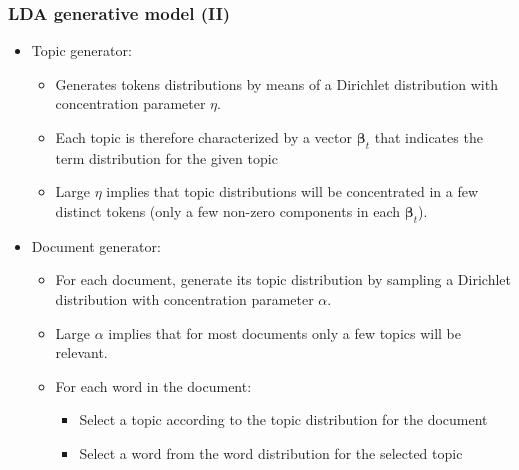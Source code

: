 \documentclass{beamer}
\begin{document}
\begin{frame}

    \frametitle{LDA generative model (II)}

	\begin{itemize}
	\item Topic generator:
	\begin{itemize}
	\item Generates tokens distributions by means of a Dirichlet distribution with concentration parameter $\eta$.
	\item Each topic is therefore characterized by a vector $\boldsymbol{\beta}_t$ that indicates the term distribution for the given topic
	\item Large $\eta$ implies that topic distributions will be concentrated in a few distinct tokens (only a few non-zero components in each $\boldsymbol{\beta}_t$).
	\end{itemize}
	\item Document generator:
	\begin{itemize}
	\item For each document, generate its topic distribution by sampling a Dirichlet distribution with concentration parameter $\alpha$.
	\item Large $\alpha$ implies that for most documents only a few topics will be relevant.
	\item For each word in the document:
	\begin{itemize}
		\item Select a topic according to the topic distribution for the document
		\item Select a word from the word distribution for the selected topic
	\end{itemize}

	\end{itemize}

	\end{itemize}

\end{frame}
\end{document}
